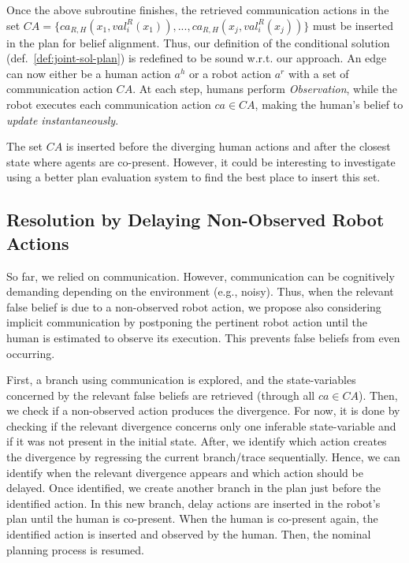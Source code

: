 {Once the above subroutine finishes, the retrieved communication actions in the set $\mathit{CA} = \{ ca_{R, H}(x_1,val^R_i(x_1)),..., ca_{R, H}(x_j,val^R_i(x_j)) \}$ must be inserted in the plan for belief alignment. 
Thus, our definition of the conditional solution (def.~\ref{def:joint-sol-plan}) is redefined to be sound w.r.t. our approach. An edge can now either be a human action $a^h$ or a robot action $a^r$ with a set of communication action $CA$.
At each step, humans perform \textit{Observation}, while the robot executes each communication action $ca \in \mathit{CA}$, making the human's belief to \textit{update instantaneously}.

The set $\mathit{CA}$ is inserted before the diverging human actions and after the closest state where agents are co-present. 
However, it could be interesting to investigate using a better plan evaluation system to find the best place to insert this set.

    \subsection{Resolution by Delaying Non-Observed Robot Actions}

So far, we relied on communication. However, communication can be cognitively demanding depending on the environment (e.g., noisy). 
Thus, when the relevant false belief is due to a non-observed robot action, we propose also considering implicit communication by postponing the pertinent robot action until the human is estimated to observe its execution. 
This prevents false beliefs from even occurring.

First, a branch using communication is explored, and the state-variables concerned by the relevant false beliefs are retrieved (through all $ca \in CA$).
Then, we check if a non-observed action produces the divergence. For now, it is done by checking if the relevant divergence concerns only one inferable state-variable and if it was not present in the initial state.   
After, we identify which action creates the divergence by regressing the current branch/trace sequentially. Hence, we can identify when the relevant divergence appears and which action should be delayed.
Once identified, we create another branch in the plan just before the identified action. In this new branch, {\sc delay} actions are inserted in the robot's plan until the human is co-present. When the human is co-present again, the identified action is inserted and observed by the human. Then, the nominal planning process is resumed.  

}
